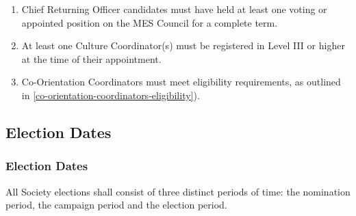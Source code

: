 \begin{enumerate}
 \item
  Chief Returning Officer candidates must have held at least one voting
  or appointed position on the MES Council for a complete term.
 \item
  At least one Culture Coordinator(s) must be registered in Level III or
  higher at the time of their appointment.
 \item
  Co-Orientation Coordinators must meet eligibility requirements, as
  outlined in \ref{co-orientation-coordinators-eligibility}).
\end{enumerate}

\hypertarget{election-dates}{%
 \subsection{Election Dates}
 \label{election-dates}}

\hypertarget{election-dates-1}{%
 \subsubsection{Election Dates}
 \label{election-dates-1}}
All Society elections shall consist of three distinct periods of time:
the nomination period, the campaign period and the election period.

